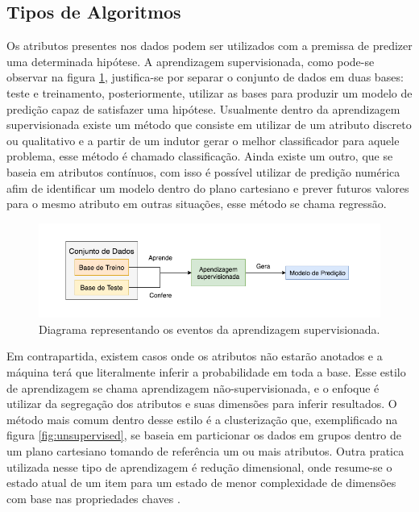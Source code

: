 \subsection{Tipos de Algoritmos}
Os atributos presentes nos dados podem ser utilizados com a premissa de predizer uma determinada hipótese. A aprendizagem supervisionada, como pode-se observar na figura \ref{fig:supervisedlearning}, justifica-se por separar o conjunto de dados em duas bases: teste e treinamento, posteriormente, utilizar as bases para produzir um modelo de predição capaz de satisfazer uma hipótese. Usualmente dentro da aprendizagem supervisionada existe um método que consiste em utilizar de um atributo discreto ou qualitativo e a partir de um indutor gerar o melhor classificador para aquele problema, esse método é chamado classificação. Ainda existe um outro, que se baseia em atributos contínuos, com isso é possível utilizar de predição numérica afim de identificar um modelo dentro do plano cartesiano e prever futuros valores para o mesmo atributo em outras situações, esse método se chama regressão. \cite{hastie2009unsupervised, russell2003artificial}

\begin{figure}[H]
    \centering
    \includegraphics[width=.8\textwidth]{imagens/supervisedlearning.png}
    \caption{Diagrama representando os eventos da aprendizagem supervisionada.}
    \label{fig:supervisedlearning}
\end{figure}

Em contrapartida, existem casos onde os atributos não estarão anotados e a máquina terá que literalmente inferir a probabilidade em toda a base. Esse estilo de aprendizagem se chama aprendizagem não-supervisionada, e o enfoque é utilizar da segregação dos atributos e suas dimensões para inferir resultados. O método mais comum dentro desse estilo é a clusterização que, exemplificado na figura \ref{fig:unsupervised}, se baseia em particionar os dados em grupos dentro de um plano cartesiano tomando de referência um ou mais atributos. Outra pratica utilizada nesse tipo de aprendizagem é redução dimensional, onde resume-se o estado atual de um item para um estado de menor complexidade de dimensões com base nas propriedades chaves \cite{hastie2009unsupervised, mohri2012foundations}.

